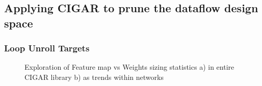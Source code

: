 \clearpage

\subsection{Applying CIGAR to prune the dataflow design space}
\label{chap:dataflow_dse:pruning:applying_it}

\subsubsection{Loop Unroll Targets}
\label{chap:dataflow_dse:pruning:applying_it:loop_unroll_targets}

\begin{figure}
    \centering
    \caption{Exploration of Feature map vs Weights sizing statistics a) in entire CIGAR library b) as trends within networks}
    \label{fig:fmap_vs_weight_hist}
\end{figure}



